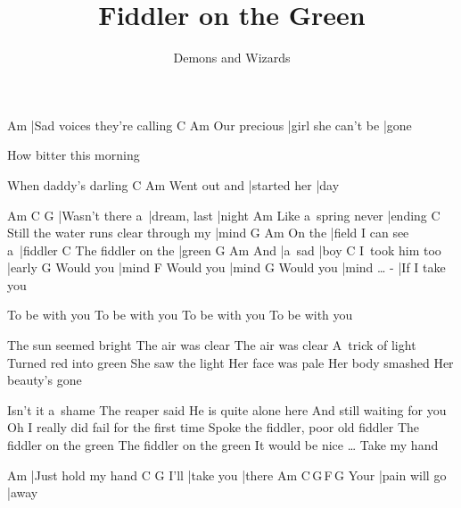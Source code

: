 \documentclass{song}
\title{Fiddler on the Green}
\author{Demons and Wizards}
\begin{document}
\begin{multicols}{2}

\strophe
Am
|Sad voices they're calling
             C                  Am
Our precious |girl she can't be |gone

How bitter this morning

When daddy's darling
             C            Am
Went out and |started her |day
\endstrophe

\strophe
Am              C            G
|Wasn't there a~|dream, last |night
                    Am
Like a~spring never |ending
                                      C
Still the water runs clear through my |mind
       G                  Am
On the |field I can see a~|fiddler
                   C
The fiddler on the |green
    G      Am
And |a~sad |boy
               C
I~took him too |early
          G
Would you |mind
          F
Would you |mind
          G
Would you |mind \ldots
-
|If I take you
\endstrophe

\columnbreak

\strophe*
To be with you
To be with you
To be with you
To be with you
\endstrophe

\strophe*
The sun seemed bright
The air was clear
The air was clear
A~trick of light
Turned red into green
She saw the light
Her face was pale
Her body smashed
Her beauty's gone
\endstrophe

\strophe*
Isn't it a~shame
The reaper said
He is quite alone here
And still waiting for you
Oh I really did fail for the first time
Spoke the fiddler, poor old fiddler
The fiddler on the green
The fiddler on the green
It would be nice \ldots
Take my hand
\endstrophe

\strophe
Am
|Just hold my hand
     C         G
I'll |take you |there
     Am            C\,G\,F\,G
Your |pain will go |away
\endstrophe

\end{multicols}
\end{document}
